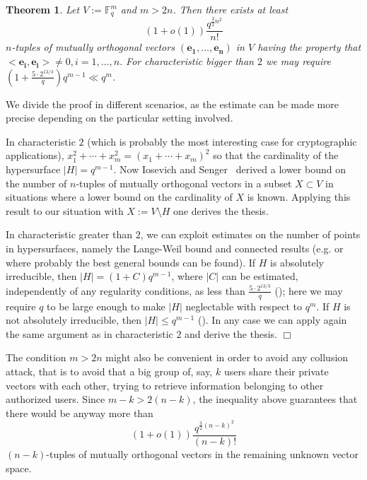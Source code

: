 \documentclass[a4paper,11pt]{amsart}
\newtheorem{theorem}{Theorem}
\theoremstyle{definition}
\newcommand{\F}{\mathbb{F}}
\begin{document}
\begin{theorem}
  Let $V:=\F_q^m$ and
  $m > 2n$. Then there exists at least
$$
(1+o(1))\frac{q^{\frac{3}{2}n^2}}{n!}
$$
$n$-tuples of mutually orthogonal vectors
$(\mathbf{e_1},\ldots,\mathbf{e_n})$ in $V$ having the property that
$<\mathbf{e_i},\mathbf{e_i}>\neq 0, i=1,\ldots,n.$ For characteristic bigger than $2$ we may require $(1+\frac{5\cdot 2^{13/3}}{q})q^{m-1}\ll q^{m}$.
\end{theorem}

We divide the proof in different scenarios, as the estimate can be
made more precise depending on the particular setting involved.

In characteristic $2$ (which is probably the most interesting case for
cryptographic applications), $x_1^2+\cdots+x_m^2=(x_1+\cdots+x_m)^2$
so that the cardinality of the hypersurface $|H|=q^{m-1}$.  Now
Iosevich and Senger~\cite{iosevich,vinh} derived a lower bound on the
number of $n$-tuples of mutually orthogonal vectors in a subset
$X\subset V$ in situations where a lower bound on the cardinality of
$X$ is known. Applying this result to our situation with
$X:=V\setminus H$ one derives the thesis.

In characteristic greater than $2$, we can exploit estimates on the
number of points in hypersurfaces, namely the Lange-Weil bound and
connected results (e.g.\cite{cafure} or\cite{la14p} where probably the 
best general bounds can be found). If $H$ is absolutely
irreducible, then $|H|=(1+C)q^{m-1}$, where $|C|$ can be estimated,
independently of any regularity conditions, as less than $\frac{5\cdot
  2^{13/3}}{q}$ (\cite[Theorem 5.2]{cafure}); here we may require $q$
to be large enough to make $|H|$ neglectable with respect to $q^m$. If
$H$ is not absolutely irreducible, then $|H|\leq q^{m-1}$ (\cite[Lemma
2.3]{cafure}). In any case we can apply again the same argument as in
characteristic $2$ and derive the thesis. $\Box$

\medskip 

The condition $m > 2n$ might also be convenient in order to avoid any
collusion attack, that is to avoid that a big group of, say, $k$ users
share their private vectors with each other, trying to retrieve
information belonging to other authorized users. Since $m-k>2(n-k)$,
the inequality above guarantees that there would be anyway more than
$$
(1+o(1))\frac{q^{\frac{3}{2}(n-k)^2}}{(n-k)!}
$$
$(n-k)$-tuples of mutually orthogonal vectors in the remaining unknown
vector space.
\end{document}
